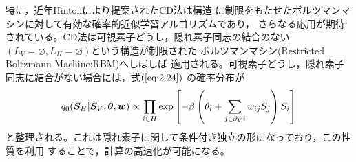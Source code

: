 特に，近年Hintonにより提案されたCD法\cite{hinton2002training}は構造
に制限をもたせたボルツマンマシンに対して有効な確率的近似学習アルゴリズムであり，
さらなる応用が期待されている。CD法は可視素子どうし，隠れ素子同志の結合のない
$(L_{V}=\varnothing,L_{H}=\varnothing)$という構造が制限された
ボルツマンマシン(Restricted Boltzmann Machine:RBM)へしばしば
適用される。可視素子どうし，隠れ素子同志に結合がない場合には，式$(\ref{eq:2.24})$
の確率分布が
\begin{equation}
q_{0}(\bm{S}_{H}|\bm{S}_{V},\boldsymbol{\theta},\bm{w})
\propto\prod_{i\in H}\exp\left[-\beta\left(\theta_{i}
+\sum_{j\in\partial_{V}i}w_{ij}S_{j}\right)S_{i}\right]
\label{eq:2.32}
\end{equation}
と整理される。これは隠れ素子に関して条件付き独立の形になっており，この性質を利用
することで，計算の高速化が可能になる。